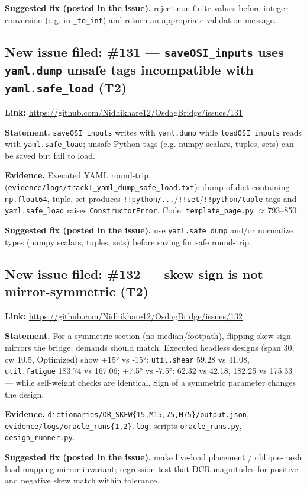 \documentclass[11pt,a4paper]{article}
\begin{document}
\textbf{Suggested fix (posted in the issue).} reject non-finite values before integer conversion (e.g. in \texttt{\_to\_int}) and return an appropriate validation message.

\subsection{New issue filed: \#131 --- \texttt{saveOSI\_inputs} uses \texttt{yaml.dump} unsafe tags incompatible with \texttt{yaml.safe\_load} (T2)}
\textbf{Link:} \url{https://github.com/Nidhikhare12/OsdagBridge/issues/131}

\textbf{Statement.} \texttt{saveOSI\_inputs} writes with \texttt{yaml.dump} while \texttt{loadOSI\_inputs} reads with \texttt{yaml.safe\_load}; unsafe Python tags (e.g. numpy scalars, tuples, sets) can be saved but fail to load.

\textbf{Evidence.} Executed YAML round-trip (\texttt{evidence/logs/trackI\_yaml\_dump\_safe\_load.txt}): dump of dict containing \texttt{np.float64}, tuple, set produces \texttt{!!python/...}/\texttt{!!set}/\texttt{!!python/tuple} tags and \texttt{yaml.safe\_load} raises \texttt{ConstructorError}. Code: \texttt{template\_page.py} $\approx$793--850.

\textbf{Suggested fix (posted in the issue).} use \texttt{yaml.safe\_dump} and/or normalize types (numpy scalars, tuples, sets) before saving for safe round-trip.

\subsection{New issue filed: \#132 --- skew sign is not mirror-symmetric (T2)}
\textbf{Link:} \url{https://github.com/Nidhikhare12/OsdagBridge/issues/132}

\textbf{Statement.} For a symmetric section (no median/footpath), flipping skew sign mirrors the bridge; demands should match. Executed headless designs (span 30, cw 10.5, Optimized) show +15° vs -15°: \texttt{util.shear} 59.28 vs 41.08, \texttt{util.fatigue} 183.74 vs 167.06; +7.5° vs -7.5°: 62.32 vs 42.18, 182.25 vs 175.33 — while self-weight checks are identical. Sign of a symmetric parameter changes the design.

\textbf{Evidence.} \texttt{dictionaries/OR\_SKEW\{15,M15,75,M75\}/output.json}, \texttt{evidence/logs/oracle\_runs\{1,2\}.log}; scripts \texttt{oracle\_runs.py}, \texttt{design\_runner.py}.

\textbf{Suggested fix (posted in the issue).} make live-load placement / oblique-mesh load mapping mirror-invariant; regression test that DCR magnitudes for positive and negative skew match within tolerance.
\end{document}
